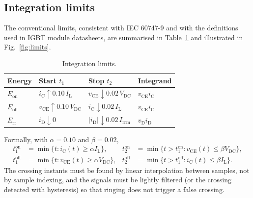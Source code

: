 \documentclass[11pt,a4paper]{article}
\newcommand{\Eon}{E_{\mathrm{on}}}
\newcommand{\Eoff}{E_{\mathrm{off}}}
\newcommand{\Err}{E_{\mathrm{rr}}}
\newcommand{\vce}{v_{\mathrm{CE}}}
\newcommand{\ic}{i_{\mathrm{C}}}
\newcommand{\Vdc}{V_{\mathrm{DC}}}
\newcommand{\IL}{I_{\mathrm{L}}}
\begin{document}
\subsection{Integration limits}

The conventional limits, consistent with IEC 60747-9 and with the definitions used in
IGBT module datasheets, are summarised in Table~\ref{tab:limits} and illustrated in
Fig.~\ref{fig:limits}.

\begin{table}[htbp]
\centering
\caption{Integration limits.}
\label{tab:limits}
\begin{tabular}{llll}
\toprule
Energy & Start $t_1$ & Stop $t_2$ & Integrand \\
\midrule
$\Eon$  & $\ic \uparrow 0.10\,\IL$ & $\vce \downarrow 0.02\,\Vdc$ & $\vce \ic$ \\
$\Eoff$ & $\vce \uparrow 0.10\,\Vdc$ & $\ic \downarrow 0.02\,\IL$ & $\vce \ic$ \\
$\Err$  & $i_{\mathrm{D}} \downarrow 0$ & $|i_{\mathrm{D}}| \downarrow 0.02\,I_{\mathrm{rrm}}$ & $v_{\mathrm{D}} i_{\mathrm{D}}$ \\
\bottomrule
\end{tabular}
\end{table}

Formally, with $\alpha=0.10$ and $\beta=0.02$,
\begin{align}
t_{1}^{\mathrm{on}}  &= \min\{t: \ic(t)\ge \alpha \IL\}, &
t_{2}^{\mathrm{on}}  &= \min\{t>t_1^{\mathrm{on}}: \vce(t)\le \beta \Vdc\}, \\
t_{1}^{\mathrm{off}} &= \min\{t: \vce(t)\ge \alpha \Vdc\}, &
t_{2}^{\mathrm{off}} &= \min\{t>t_1^{\mathrm{off}}: \ic(t)\le \beta \IL\}.
\end{align}
The crossing instants must be found by linear interpolation between samples, not by
sample indexing, and the signals must be lightly filtered (or the crossing detected with
hysteresis) so that ringing does not trigger a false crossing.
\end{document}
